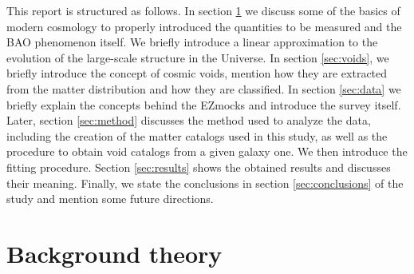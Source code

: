 \documentclass[fleqn, usenatbib]{mnras}
\begin{document}
This report is structured as follows. In section \ref{sec:theory} we discuss some of the basics of modern cosmology to properly introduced the quantities to be measured and the BAO phenomenon itself. We briefly introduce a linear approximation to the evolution of the large-scale structure in the Universe. In section \ref{sec:voids}, we briefly introduce the concept of cosmic voids, mention how they are extracted from the matter distribution and how they are classified. In section \ref{sec:data} we briefly explain the concepts behind the EZmocks and introduce the survey itself. Later, section \ref{sec:method} discusses the method used to analyze the data, including the creation of the matter catalogs used in this study, as well as the procedure to obtain void catalogs from a given galaxy one. We then introduce the fitting procedure. Section \ref{sec:results} shows the obtained results and discusses their meaning. Finally, we state the conclusions in section \ref{sec:conclusions} of the study and mention some future directions.

\section{Background theory}
\label{sec:theory}
\end{document}
